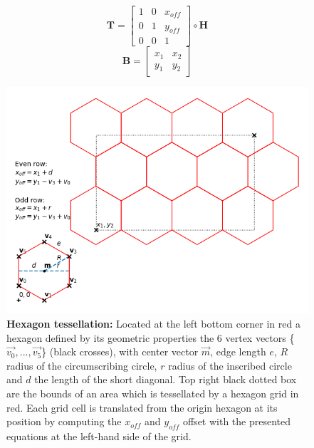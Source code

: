 		\begin{equation}
		\label{eq:translate}
		\mathbf{T} =
			\begin{bmatrix}
				1 & 0 & x_{off} \\
				0 & 1 & y_{off} \\
				0 & 0 & 1
			\end{bmatrix} \circ \mathbf{H}
		\end{equation}
		\begin{equation}
		\label{eq:bounds}
			\mathbf{B} =
			\begin{bmatrix}
				x_1 & x_2 \\
				y_1 & y_2
			\end{bmatrix}
		\end{equation}
		\begin{figure}[ht]
			\centering
			\includegraphics[scale=.7]{img/hexagons}
			\caption[Hexagon tessellation]{\textbf{Hexagon tessellation:} Located at the left bottom corner in red a hexagon defined by its geometric properties the 6 vertex vectors \{$\vec{v_0},...,\vec{v_5}$\} (black crosses), with center vector $\vec{m}$, edge length $e$, $R$ radius of the circumscribing circle, $r$ radius of the inscribed circle and $d$ the length of the short diagonal. Top right black dotted box are the bounds of an area which is tessellated by a hexagon grid in red. Each grid cell is translated from the origin hexagon at its position by computing the $x_{off}$ and $y_{off}$ offset with the presented equations at the left-hand side of the grid. }
			\label{fig:hexagon}
		\end{figure}
